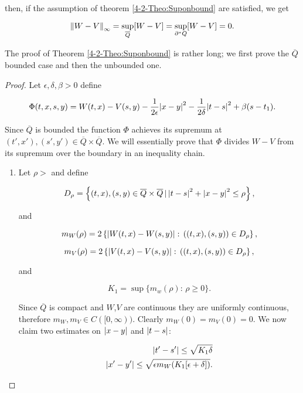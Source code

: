 then, if the assumption of theorem \ref{4-2-Theo:Suponbound} are satisfied, we get

\[\norm{W-V}_{\infty} = \sup_{\overline{Q}}[W-V]=\sup_{\partial^{\ast}Q}[W-V] = 0.\]

The proof of Theorem \ref{4-2-Theo:Suponbound} is rather long; we first prove the $\overline{Q}$ bounded case and then the unbounded one.

\begin{proof}
    Let $\epsilon, \delta, \beta >0$ define
    
    \begin{equation}\label{4-2-InProofSup:phi}
        \Phi(t,x,s,y) = W(t,x) - V(s,y) - \frac{1}{2\epsilon} \abs{x-y}^2 -\frac{1}{2\delta} \abs{t-s}^2 + \beta(s-t_1).   
    \end{equation}

    Since $\overline{Q}$ is bounded the function $\Phi$ achieves its supremum at $(t',x'),(s',y')\in\overline{Q}\times\overline{Q}$. We will essentially prove 
    that $\Phi$ divides $W-V$ from its supremum over the boundary in an inequality chain.
    
    \begin{enumerate}
        \item Let $\rho>$ and define
        
        \begin{equation}\label{4-2-InProofSup:Drho}
            D_{\rho} = \left\{(t,x),(s,y)\in\overline{Q}\times\overline{Q}\,|\,\abs{t-s}^2+\abs{x-y}^2\leq\rho\right\},
        \end{equation}

        and 

        \[m_W(\rho)=2\left\{\abs{W(t,x)-W(s,y)}:\,((t,x),(s,y))\in D_{\rho}\right\},\]

        \[m_V(\rho)=2\left\{\abs{V(t,x)-V(s,y)}:\,((t,x),(s,y))\in D_{\rho}\right\},\]

        and 

        \[K_1 = \sup\{m_w(\rho):\,\rho\geq0\}.\]

        Since $\overline{Q}$ is compact and $W$,$V$ are continuous they are uniformly continuous, therefore $m_W,m_V\in C([0,\infty))$. Clearly 
        $m_W(0)=m_V(0)=0$. We now claim two estimates on $\abs{x-y}$ and $\abs{t-s}$:

        \begin{equation}
            \begin{aligned}
                \abs{t'-s'}\leq\sqrt{K_1\delta} \\
                \abs{x'-y'}\leq \sqrt{\epsilon m_W(K_1[\epsilon+\delta])}.
            \end{aligned}
        \end{equation}


\end{enumerate}
\end{proof}
